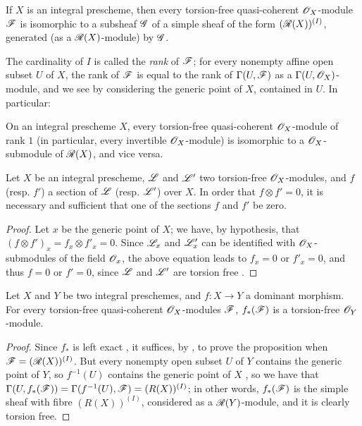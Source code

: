 \begin{prop}[7.4.2]
\label{1.7.4.2}
If $X$ is an integral prescheme, then every torsion-free quasi-coherent $\mathscr{O}_X$-module $\mathscr{F}$ is isomorphic to a subsheaf $\mathscr{G}$ of a simple sheaf of the form $(\mathscr{R}(X))^{(I)}$, generated (as a $\mathscr{R}(X)$-module) by $\mathscr{G}$.
\end{prop}

The cardinality of $I$ is called the \emph{rank} of $\mathscr{F}$; for every nonempty affine open subset $U$ of $X$, the rank of $\mathscr{F}$ is equal to the rank of $\Gamma(U,\mathscr{F})$ as a $\Gamma(U,\mathscr{O}_X)$-module, and we see by considering the generic point of $X$, contained in $U$.
In particular:

\begin{cor}[7.4.3]
\label{1.7.4.3}
On an integral prescheme $X$, every torsion-free quasi-coherent $\mathscr{O}_X$-module of rank $1$ (in particular, every invertible $\mathscr{O}_X$-module) is isomorphic to a $\mathscr{O}_X$-submodule of $\mathscr{R}(X)$, and vice versa.
\end{cor}

\begin{cor}[7.4.4]
\label{1.7.4.4}
Let $X$ be an integral prescheme, $\mathscr{L}$ and $\mathscr{L}'$ two torsion-free $\mathscr{O}_X$-modules, and $f$ (resp. $f'$) a section of $\mathscr{L}$ (resp. $\mathscr{L}'$) over $X$.
In order that $f\otimes f'=0$, it is necessary and sufficient that one of the sections $f$ and $f'$ be zero.
\end{cor}

\begin{proof}
\label{proof-1.7.4.4}
Let $x$ be the generic point of $X$; we have, by hypothesis, that $(f\otimes f')_x=f_x\otimes f'_x=0$.
Since $\mathscr{L}_x$ and $\mathscr{L}'_x$ can be identified with $\mathscr{O}_X$-submodules of the field $\mathscr{O}_x$, the above equation leads to $f_x=0$ or $f'_x=0$, and thus $f=0$ or $f'=0$, since $\mathscr{L}$ and $\mathscr{L}'$ are torsion free .
\end{proof}

\begin{prop}[7.4.5]
\label{1.7.4.5}
Let $X$ and $Y$ be two integral preschemes, and $f:X\to Y$ a dominant morphism.
For every torsion-free quasi-coherent $\mathscr{O}_X$-modules $\mathscr{F}$, $f_*(\mathscr{F})$ is a torsion-free $\mathscr{O}_Y$-module.
\end{prop}

\begin{proof}
\label{proof-1.7.4.5}
Since
$f_*$ is left exact , it suffices, by , to prove the proposition when $\mathscr{F}=(\mathscr{R}(X))^{(I)}$.
But every nonempty open subset $U$ of $Y$ contains the generic point of $Y$, so $f^{-1}(U)$ contains the generic point of $X$ , so we have that $\Gamma(U,f_*(\mathscr{F}))=\Gamma(f^{-1}(U),\mathscr{F})=(R(X))^{(I)}$; in other words, $f_*(\mathscr{F})$ is the simple sheaf with fibre $(R(X))^{(I)}$, considered as a $\mathscr{R}(Y)$-module, and it is clearly torsion free.
\end{proof}

